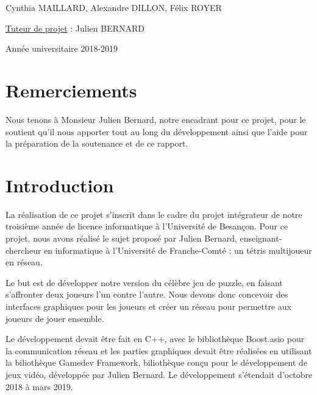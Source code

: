\documentclass[a4paper, 12pt]{article}
\begin{document}
\begin{titlepage}
\begin{sffamily}
\begin{center}
    \vspace{1cm}

    \Large{Cynthia MAILLARD, Alexandre DILLON, Félix ROYER} \\

    \vspace{0.25cm}

    \Large{\underline{Tuteur de projet} : Julien BERNARD}
    
    \vspace{0.5cm}

    {\large Année universitaire 2018-2019}

    \end{center}
    \end{sffamily}
    \thispagestyle{empty}%


\end{titlepage}

\newpage

\tableofcontents

\newpage

\section*{Remerciements}

Nous tenons à Monsieur Julien Bernard, notre encadrant pour ce projet, pour le soutient qu'il nous apporter tout au long du développement ainsi que l'aide pour la préparation de la soutenance et de ce rapport.

\newpage
	
\section*{Introduction}
	La réalisation de ce projet s'inscrit dans le cadre du projet intégrateur de notre troisième année de licence informatique à l'Université de Besançon. Pour ce projet, nous avons réalisé le sujet proposé par Julien Bernard, enseignant-chercheur en informatique à l'Université de Franche-Comté : un tétris multijoueur en réseau.

	\bigskip

	Le but est de développer notre version du célèbre jeu de puzzle, en faisant s'affronter deux joueurs l'un contre l'autre. Nous devons donc concevoir des interfaces graphiques pour les joueurs et créer un réseau pour permettre aux joueurs de jouer ensemble.

	\bigskip

	Le développement devait être fait en C++, avec le bibliothèque Boost.asio pour la communication réseau et les parties graphiques devait être réalisées en utilisant la biliothèque Gamedev Framework, biliothèque conçu pour le développement de jeux vidéo, développée par Julien Bernard.
	Le développement s'étendait d'octobre 2018 à mars 2019.
\end{document}
